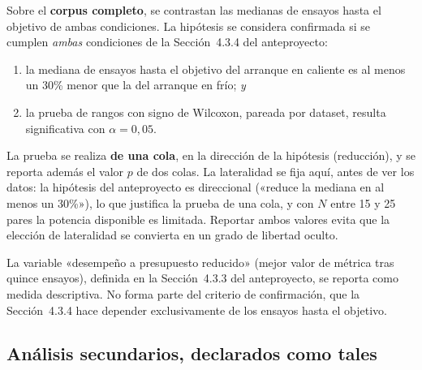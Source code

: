 \documentclass[11pt,letterpaper]{article}
\begin{document}
Sobre el \textbf{corpus completo}, se contrastan las medianas de ensayos hasta el
objetivo de ambas condiciones. La hipótesis se considera confirmada si se cumplen
\emph{ambas} condiciones de la Sección~4.3.4 del anteproyecto:

\begin{enumerate}
  \item la mediana de ensayos hasta el objetivo del arranque en caliente es al
        menos un 30\% menor que la del arranque en frío; \emph{y}
  \item la prueba de rangos con signo de Wilcoxon, pareada por dataset, resulta
        significativa con $\alpha = 0{,}05$.
\end{enumerate}

La prueba se realiza \textbf{de una cola}, en la dirección de la hipótesis
(reducción), y se reporta además el valor $p$ de dos colas. La lateralidad se fija
aquí, antes de ver los datos: la hipótesis del anteproyecto es direccional
(«reduce la mediana en al menos un 30\%»), lo que justifica la prueba de una
cola, y con $N$ entre 15 y 25 pares la potencia disponible es limitada. Reportar
ambos valores evita que la elección de lateralidad se convierta en un grado de
libertad oculto.

La variable «desempeño a presupuesto reducido» (mejor valor de métrica tras
quince ensayos), definida en la Sección~4.3.3 del anteproyecto, se reporta como
medida descriptiva. No forma parte del criterio de confirmación, que la
Sección~4.3.4 hace depender exclusivamente de los ensayos hasta el objetivo.

\subsection{Análisis secundarios, declarados como tales}
\end{document}
